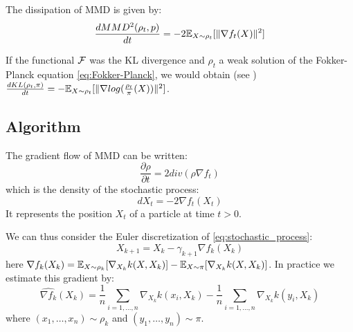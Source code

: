\begin{proposition}
 The dissipation of MMD is given by:  
	\begin{equation}
	\frac{d MMD^2(\rho_t, p)}{dt}=-2 {{\mathbb E}}_{X \sim \rho_t}[\|\nabla f_t(X)\|^2]
	\end{equation}
\end{proposition}

\begin{remark}
	If the functional ${{\mathcal F}}$ was the KL divergence and $\rho_t$ a weak solution of the Fokker-Planck equation \eqref{eq:Fokker-Planck}, we would obtain (see \cite{wibisono2018sampling}) $\frac{d KL(\rho_t, \pi)}{dt}=-{{\mathbb E}}_{X \sim \rho_t}[\|\nabla log(\frac{\rho_t}{\pi}(X))\|^2]$.
\end{remark}




\subsection{Algorithm}

The gradient flow of MMD can be written:
\begin{equation*}
\frac{\partial \rho}{\partial t}= 2 div(\rho  \nabla f_t)
\end{equation*}
which is the density of the stochastic process:
\begin{equation}\label{eq:stochastic_process}
dX_t=-2\nabla f_t(X_t) 
\end{equation}
It represents the position $X_t$ of a particle at time $t > 0$.


We can thus consider the Euler discretization of \eqref{eq:stochastic_process}:
\begin{equation}\label{eq:discretization}
X_{k+1}=X_k - \gamma_{k+1} \nabla f_k(X_k)
\end{equation}
here $\nabla f_k(X_k)= {{\mathbb E}}_{X \sim \rho_k}[\nabla_{X_k}k(X,X_k)] -  {{\mathbb E}}_{X \sim \pi}[\nabla_{X_k}k(X,X_k)]$.
In practice we estimate this gradient by:
\begin{equation*}
\widehat{\nabla f_k}(X_k)=\frac{1}{n}\sum_{i=1,\dots,n}\nabla_{X_k}k(x_i,X_k) - \frac{1}{n}\sum_{i=1,\dots,n}\nabla_{X_k}k(y_i,X_k)
\end{equation*}
where $(x_1, \dots, x_n)\sim \rho_k$ and $(y_1, \dots, y_n)\sim \pi$.


